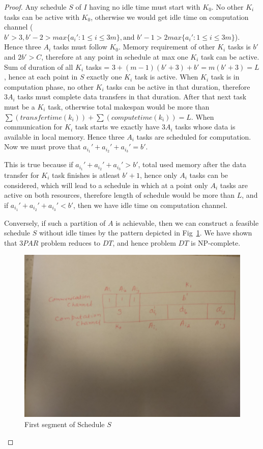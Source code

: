 \documentclass[runningheads]{llncs} %
\begin{document}
\begin{proof}
	Any schedule $S$ of $I$ having no idle time must start with $K_0$. No other $K_i$ tasks can be active with $K_0$, otherwise we would get idle time on computation channel ($b'>3, b'-2>max\{a_i':1\le i\le 3m\},  \text{and } b'-1 > 2 max\{a_i':1\le i\le 3m\}$). Hence three $A_i$ tasks must follow $K_0$.   	 
   	Memory requirement of other $K_i$ tasks is $b'$ and $2b'>C$, therefore at any point in schedule at max one $K_i$ task can be active. Sum of duration of all $K_i$ tasks = $3 + (m-1)(b'+3) + b' = m (b'+3)=L$, hence at each point in $S$ exactly one $K_i$ task is active. When $K_i$ task is in computation phase, no other $K_i$ tasks can be active in that duration, therefore  $3A_i$ tasks must complete data transfers in that duration. After that next task must be a 
   	$K_i$ task, otherwise total makespan would be more than $\sum(transfertime(k_i))  + 
   	\sum(computetime(k_i)) =L$. When communication for  $K_i$ task starts we exactly have $3A_i$ 
   	tasks whose data is available in local memory. Hence three $A_i$ tasks are scheduled for computation. Now we must prove that $a_{i_1}' + a_{i_2}'  + a_{i_3}'  = b'$.
   	
   	This is true because if $a_{i_1}' + a_{i_2}'  + a_{i_3}'  > b'$, total used memory after the data transfer 
   	for  $K_i$ task finishes is atleast $b'+1$, hence only $A_i$ tasks can be considered, which will lead to a schedule in which at a point only $A_i$ tasks are active on both resources, therefore length of 
   	schedule would be more than $L$, and if $a_{i_1}' + a_{i_2}'  + a_{i_3}'  < b'$, then we have idle time on computation channel.
   	
   	Conversely, if such a partition of $A$ is achievable, then we can construct a feasible schedule $S$ 
   	without idle times by the pattern depicted in Fig~\ref{fig:firstSegment}. We have shown that $3PAR$ 
   	problem reduces to $DT$, and hence problem $DT$ is NP-complete.
   	
   	
   	\begin{figure}[htb]
   		\centering
   		\includegraphics[scale=0.07]{Figs/3PARToSched.jpg}
   		\caption{ \label{fig:firstSegment} First segment of Schedule $S$}
   	\end{figure}
   	
   \end{proof}
\end{document}
